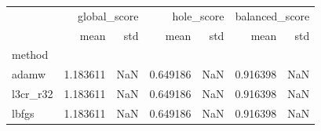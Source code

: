 \begin{tabular}{lrrrrrr}
\toprule
 & \multicolumn{2}{r}{global_score} & \multicolumn{2}{r}{hole_score} & \multicolumn{2}{r}{balanced_score} \\
 & mean & std & mean & std & mean & std \\
method &  &  &  &  &  &  \\
\midrule
adamw & 1.183611 & NaN & 0.649186 & NaN & 0.916398 & NaN \\
l3cr_r32 & 1.183611 & NaN & 0.649186 & NaN & 0.916398 & NaN \\
lbfgs & 1.183611 & NaN & 0.649186 & NaN & 0.916398 & NaN \\
\bottomrule
\end{tabular}
